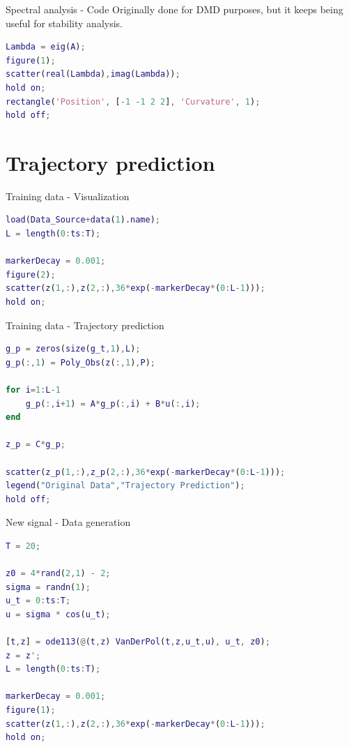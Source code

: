 \documentclass{beamer}
\begin{document}
\begin{frame}[fragile]{Spectral analysis - Code}
    Originally done for DMD purposes, but it keeps being useful for stability analysis.

    \begin{lstlisting}[language=Matlab]
Lambda = eig(A);
figure(1);
scatter(real(Lambda),imag(Lambda));
hold on;
rectangle('Position', [-1 -1 2 2], 'Curvature', 1);
hold off;
    \end{lstlisting}
\end{frame}


\section{Trajectory prediction}

\begin{frame}[fragile]{Training data - Visualization}
    \begin{lstlisting}[language=Matlab]
load(Data_Source+data(1).name);
L = length(0:ts:T);

markerDecay = 0.001;
figure(2);
scatter(z(1,:),z(2,:),36*exp(-markerDecay*(0:L-1)));
hold on;
    \end{lstlisting}
\end{frame}

\begin{frame}[fragile]{Training data - Trajectory prediction}
    \begin{lstlisting}[language=Matlab]
g_p = zeros(size(g_t,1),L);
g_p(:,1) = Poly_Obs(z(:,1),P);

for i=1:L-1
    g_p(:,i+1) = A*g_p(:,i) + B*u(:,i);
end

z_p = C*g_p;

scatter(z_p(1,:),z_p(2,:),36*exp(-markerDecay*(0:L-1)));
legend("Original Data","Trajectory Prediction");
hold off;
    \end{lstlisting}
\end{frame}

\begin{frame}[fragile]{New signal - Data generation}
    \begin{lstlisting}[language=matlab]
T = 20;

z0 = 4*rand(2,1) - 2;
sigma = randn(1);
u_t = 0:ts:T;
u = sigma * cos(u_t);

[t,z] = ode113(@(t,z) VanDerPol(t,z,u_t,u), u_t, z0);
z = z';
L = length(0:ts:T);

markerDecay = 0.001;
figure(1);
scatter(z(1,:),z(2,:),36*exp(-markerDecay*(0:L-1)));
hold on;
    \end{lstlisting}
\end{frame}
\end{document}
